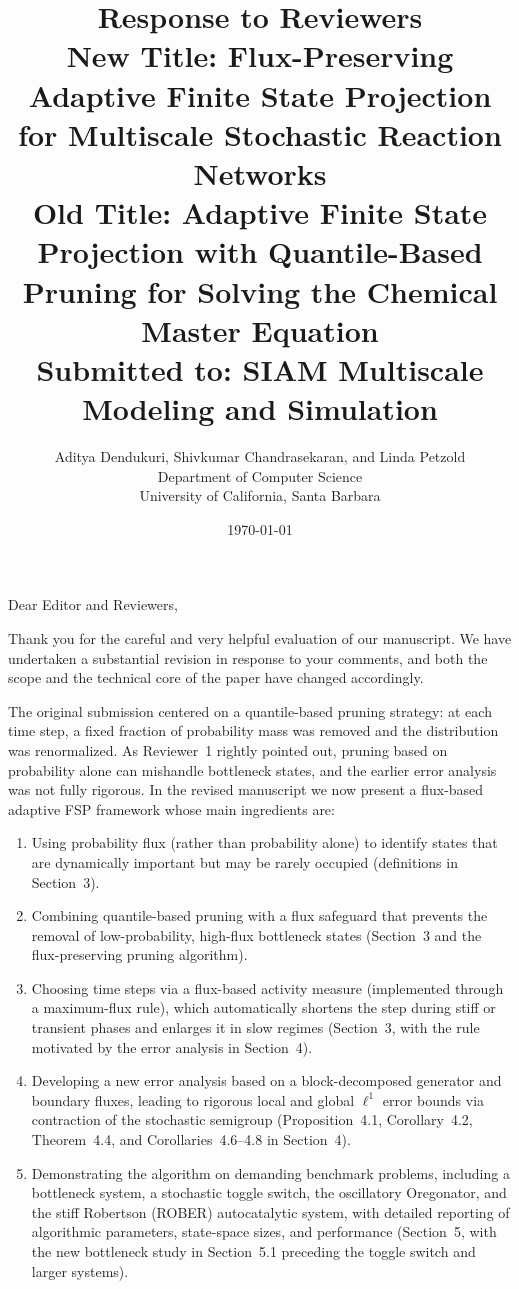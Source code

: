 \documentclass[11pt]{article}
\title{\textbf{Response to Reviewers}\\[0.5em]
\large \textbf{New Title}: Flux-Preserving Adaptive Finite State Projection\\
for Multiscale Stochastic Reaction Networks\\[0.5em]
\textbf{Old Title: } Adaptive Finite State Projection with Quantile-Based\\
 Pruning for Solving the Chemical Master Equation\\[0.5em]
\normalsize Submitted to: SIAM Multiscale Modeling and Simulation}
\author{Aditya Dendukuri, Shivkumar Chandrasekaran, and Linda Petzold\\
Department of Computer Science\\
University of California, Santa Barbara}
\date{\today}
\begin{document}
\maketitle

\noindent Dear Editor and Reviewers,

\medskip

Thank you for the careful and very helpful evaluation of our manuscript. We have
undertaken a substantial revision in response to your comments, and both the scope
and the technical core of the paper have changed accordingly.

The original submission centered on a quantile-based pruning strategy: at each
time step, a fixed fraction of probability mass was removed and the distribution
was renormalized. As Reviewer~1 rightly pointed out, pruning based on probability
alone can mishandle bottleneck states, and the earlier error analysis was not
fully rigorous. In the revised manuscript we now present a flux-based adaptive FSP
framework whose main ingredients are:

\begin{enumerate}[topsep=0pt,itemsep=2pt]
  \item Using probability flux (rather than probability alone) to identify states
        that are dynamically important but may be rarely occupied (definitions in
        Section~3).
  \item Combining quantile-based pruning with a flux safeguard that prevents the
        removal of low-probability, high-flux bottleneck states (Section~3 and
        the flux-preserving pruning algorithm).
  \item Choosing time steps via a flux-based activity measure (implemented through
        a maximum-flux rule), which automatically shortens the step during stiff
        or transient phases and enlarges it in slow regimes (Section~3, with the
        rule motivated by the error analysis in Section~4).
  \item Developing a new error analysis based on a block-decomposed generator and
        boundary fluxes, leading to rigorous local and global $\ell^1$ error
        bounds via contraction of the stochastic semigroup (Proposition~4.1,
        Corollary~4.2, Theorem~4.4, and Corollaries~4.6--4.8 in Section~4).
  \item Demonstrating the algorithm on demanding benchmark problems, including a
        bottleneck system, a stochastic toggle switch, the oscillatory
        Oregonator, and the stiff Robertson (ROBER) autocatalytic system, with
        detailed reporting of algorithmic parameters, state-space sizes, and
        performance (Section~5, with the new bottleneck study in Section~5.1
        preceding the toggle switch and larger systems).
\end{enumerate}
\end{document}
